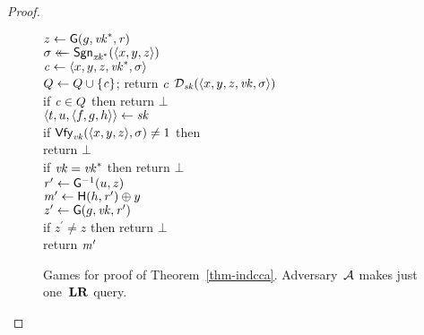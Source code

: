 \begin{proof}
\begin{figure}
{        $z \gets \mathsf{G}(g, \mathit{vk}^*, \mathit{r})$\\
        $\sigma \mathrel{\leftarrow\mkern-14mu\leftarrow} \mathsf{Sgn}_{\mathit{xk}^*}(\langle x,y,z \rangle)$\\
        $\mathit{c} \gets \langle x,y,z,\mathit{vk}^*,\sigma \rangle$\\
        $Q \gets Q \cup \{\mathit{c}\}$;
        return $\mathit{c}$
    }
    {
      \underline{$\mathcal{D}_{\mathit{sk}}(\langle x,y,z,\mathit{vk},\sigma \rangle)$}
          \hfill {}\\[2pt]
        if $\mathit{c} \in Q$ then return $\bot$\\
        $\langle t, u, \langle f, g, h \rangle \rangle \gets \mathit{sk}$\\
        if $\mathsf{Vfy}_{\mathit{vk}}(\langle x,y,z \rangle,\sigma) \ne 1$ then\\
        \tab return $\bot$\\
        if $\mathit{vk} = \mathit{vk}^*$ then return $\bot$\\
        $\mathit{r}^\prime \gets \mathsf{G}^{-1}(u, z)$\\
        $\mathit{m}^\prime \gets \mathsf{H}(h,\mathit{r}^\prime) \oplus y$\\
        $z^\prime \gets \mathsf{G}(g,\mathit{vk},\mathit{r}^\prime)$\\
        if $z^\prime \ne z$ then
          return $\bot$\\
        return $\mathit{m}^\prime$
    }
    \caption{Games for proof of Theorem~\ref{thm-indcca}. Adversary~$\mathcal{A}$ makes
    just one~$\mathbf{LR}$ query.}
    \label{fig-thm-indcca}
  \end{figure}
\end{proof}

